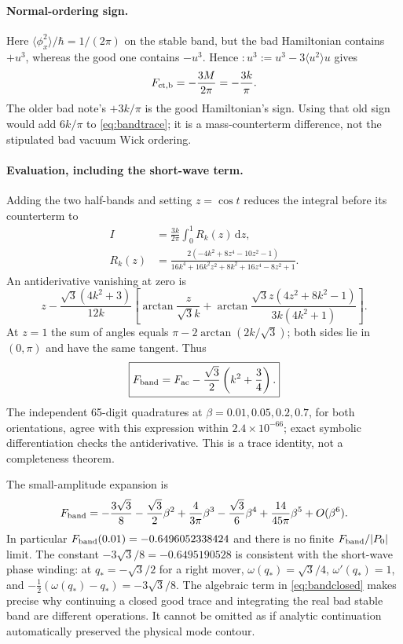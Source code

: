 \documentclass[11pt,a4paper]{article}
\newcommand{\dd}{\mathrm d}
\begin{document}
\paragraph{Normal-ordering sign.}
Here $\langle\phi_x^2\rangle/\hbar=1/(2\pi)$ on the stable band, but
the bad Hamiltonian contains $+u^3$, whereas the good one contains $-u^3$.
Hence $:u^3:=u^3-3\langle u^2\rangle u$ gives
\begin{equation}
 F_{\rm ct,b}=-\frac{3M}{2\pi}=-\frac{3k}{\pi}.
\end{equation}
The older bad note's $+3k/\pi$ is the good Hamiltonian's sign.
Using that old sign would add $6k/\pi$ to \eqref{eq:bandtrace}; it is a
mass-counterterm difference, not the stipulated bad vacuum Wick ordering.

\paragraph{Evaluation, including the short-wave term.}
Adding the two half-bands and setting $z=\cos t$ reduces the integral
before its counterterm to
\begin{align}
 I&=\frac{3k}{2\pi}\int_0^1 R_k(z)\,\dd z,\\
 R_k(z)&=\frac{2(-4k^2+8z^4-10z^2-1)}
 {16k^4+16k^2z^2+8k^2+16z^4-8z^2+1}.
\end{align}
An antiderivative vanishing at zero is
\begin{equation}
 z-\frac{\sqrt3(4k^2+3)}{12k}
 \left[\arctan\frac{z}{\sqrt3k}
 +\arctan\frac{\sqrt3z(4z^2+8k^2-1)}{3k(4k^2+1)}\right].
\end{equation}
At $z=1$ the sum of angles equals
$\pi-2\arctan(2k/\sqrt3)$; both sides lie in $(0,\pi)$ and have the
same tangent. Thus
\begin{equation}
 \boxed{F_{\rm band}=F_{\rm ac}
           -\frac{\sqrt3}{2}\left(k^2+\frac34\right).} \label{eq:bandclosed}
\end{equation}
The independent 65-digit quadratures at
$\beta=0.01,0.05,0.2,0.7$, for both orientations, agree with this expression
within $2.4\times10^{-66}$; exact symbolic differentiation checks the
antiderivative. This is a trace identity, not a completeness theorem.

The small-amplitude expansion is
\begin{equation}
 F_{\rm band}=-\frac{3\sqrt3}{8}-\frac{\sqrt3}{2}\beta^2
     +\frac4{3\pi}\beta^3-\frac{\sqrt3}{6}\beta^4
     +\frac{14}{45\pi}\beta^5+O(\beta^6).
 \label{eq:bandexp}
\end{equation}
In particular $F_{\rm band}(0.01)=-0.6496052338424$ and there is no finite
$F_{\rm band}/|P_0|$ limit. The constant
$-3\sqrt3/8=-0.6495190528$ is consistent with the short-wave phase winding:
at $q_*=-\sqrt3/2$ for a right mover,
$\omega(q_*)=\sqrt3/4$, $\omega'(q_*)=1$, and
$-\frac12(\omega(q_*)-q_*)=-3\sqrt3/8$.
The algebraic term in \eqref{eq:bandclosed} makes precise why continuing a
closed good trace and integrating the real bad stable band are different
operations. It cannot be omitted as if analytic continuation automatically
preserved the physical mode contour.
\end{document}
